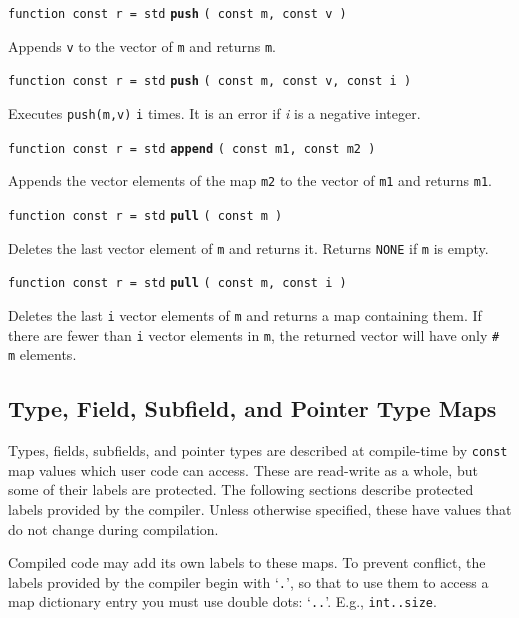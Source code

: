 \documentclass[12pt]{article}
\newcommand{\ttkey}[1]{{\tt \bfseries #1}}
\newenvironment{indpar}[1][0.3in]%
	{\begin{list}{}%
		     {\setlength{\itemsep}{0in}%
		      \setlength{\topsep}{0in}%
		      \setlength{\parsep}{1ex}%
		      \setlength{\labelwidth}{#1}%
		      \setlength{\leftmargin}{#1}%
		      \addtolength{\leftmargin}{\labelsep}}%
	 \item}%
	{\end{list}}
\begin{document}
{\tt function const r = std} \ttkey{push} {\tt ( const m, const v )}
\begin{indpar}
Appends {\tt v} to the vector of {\tt m} and returns {\tt m}.
\end{indpar}

{\tt function const r = std} \ttkey{push} {\tt ( const m, const v, const i )}
\begin{indpar}
Executes {\tt push(m,v)} {\tt i} times.  It is an error if {\em i}
is a negative integer.
\end{indpar}

{\tt function const r = std} \ttkey{append} {\tt ( const m1, const m2 )}
\begin{indpar}
Appends the vector elements of the map {\tt m2} to the vector of {\tt m1}
and returns {\tt m1}.
\end{indpar}

{\tt function const r = std} \ttkey{pull} {\tt ( const m )}
\begin{indpar}
Deletes the last vector element of {\tt m} and returns it.
Returns {\tt NONE} if {\tt m} is empty.
\end{indpar}

{\tt function const r = std} \ttkey{pull} {\tt ( const m, const i )}
\begin{indpar}
Deletes the last {\tt i} vector elements of {\tt m} and returns a map
containing them.  If there are fewer than {\tt i} vector elements
in {\tt m}, the returned vector will have only {\tt \# m} elements.
\end{indpar}

\subsection{Type, Field, Subfield, and Pointer Type Maps}
\label{TYPE-FIELD-SUBFIELD-MAPS}

Types, fields, subfields, and pointer types are described
at compile-time by {\tt const} map values which
user code can access.
These are read-write as a whole, but some of their
labels are protected.  The following sections describe protected labels
provided by the compiler.  Unless otherwise specified,
these have values that do not change during compilation.

Compiled code may add its own labels to these maps.
To prevent conflict, the labels provided by the compiler
begin with `{\tt .}', so
that to use them to access a map dictionary entry
you must use double dots: `{\tt ..}'.
E.g., {\tt int..size}.
\end{document}
